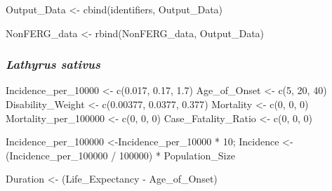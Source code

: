 \documentclass[
  letterpaper,
  DIV=11,
  numbers=noendperiod]{scrartcl}
\newenvironment{Shaded}{\begin{snugshade}}{\end{snugshade}}
\newcommand{\DecValTok}[1]{\textcolor[rgb]{0.68,0.00,0.00}{#1}}
\newcommand{\FloatTok}[1]{\textcolor[rgb]{0.68,0.00,0.00}{#1}}
\newcommand{\FunctionTok}[1]{\textcolor[rgb]{0.28,0.35,0.67}{#1}}
\newcommand{\NormalTok}[1]{\textcolor[rgb]{0.00,0.23,0.31}{#1}}
\newcommand{\OtherTok}[1]{\textcolor[rgb]{0.00,0.23,0.31}{#1}}
\newcommand{\SpecialCharTok}[1]{\textcolor[rgb]{0.37,0.37,0.37}{#1}}
\begin{document}
\begin{Shaded}
\begin{Highlighting}[]
\NormalTok{Output\_Data }\OtherTok{\textless{}{-}} \FunctionTok{cbind}\NormalTok{(identifiers,  Output\_Data)}

\NormalTok{NonFERG\_data }\OtherTok{\textless{}{-}} \FunctionTok{rbind}\NormalTok{(NonFERG\_data,  Output\_Data)}
\end{Highlighting}
\end{Shaded}

\subsubsection{\texorpdfstring{\emph{Lathyrus
sativus}}{Lathyrus sativus}}\label{lathyrus-sativus}

\begin{Shaded}
\begin{Highlighting}[]
\NormalTok{Incidence\_per\_10000 }\OtherTok{\textless{}{-}} \FunctionTok{c}\NormalTok{(}\FloatTok{0.017}\NormalTok{, }\FloatTok{0.17}\NormalTok{, }\FloatTok{1.7}\NormalTok{)}
\NormalTok{Age\_of\_Onset }\OtherTok{\textless{}{-}} \FunctionTok{c}\NormalTok{(}\DecValTok{5}\NormalTok{, }\DecValTok{20}\NormalTok{, }\DecValTok{40}\NormalTok{)}
\NormalTok{Disability\_Weight }\OtherTok{\textless{}{-}} \FunctionTok{c}\NormalTok{(}\FloatTok{0.00377}\NormalTok{, }\FloatTok{0.0377}\NormalTok{, }\FloatTok{0.377}\NormalTok{)}
\NormalTok{Mortality }\OtherTok{\textless{}{-}} \FunctionTok{c}\NormalTok{(}\DecValTok{0}\NormalTok{, }\DecValTok{0}\NormalTok{, }\DecValTok{0}\NormalTok{)}
\NormalTok{Mortality\_per\_100000 }\OtherTok{\textless{}{-}} \FunctionTok{c}\NormalTok{(}\DecValTok{0}\NormalTok{, }\DecValTok{0}\NormalTok{, }\DecValTok{0}\NormalTok{)}
\NormalTok{Case\_Fatality\_Ratio }\OtherTok{\textless{}{-}} \FunctionTok{c}\NormalTok{(}\DecValTok{0}\NormalTok{, }\DecValTok{0}\NormalTok{, }\DecValTok{0}\NormalTok{)}

\NormalTok{Incidence\_per\_100000 }\OtherTok{\textless{}{-}}\NormalTok{Incidence\_per\_10000 }\SpecialCharTok{*} \DecValTok{10}\NormalTok{;}
\NormalTok{Incidence }\OtherTok{\textless{}{-}}\NormalTok{ (Incidence\_per\_100000 }\SpecialCharTok{/} \DecValTok{100000}\NormalTok{) }\SpecialCharTok{*}\NormalTok{ Population\_Size}

\NormalTok{Duration }\OtherTok{\textless{}{-}}\NormalTok{ (Life\_Expectancy }\SpecialCharTok{{-}}\NormalTok{ Age\_of\_Onset)}


\end{Highlighting}
\end{Shaded}
\end{document}
